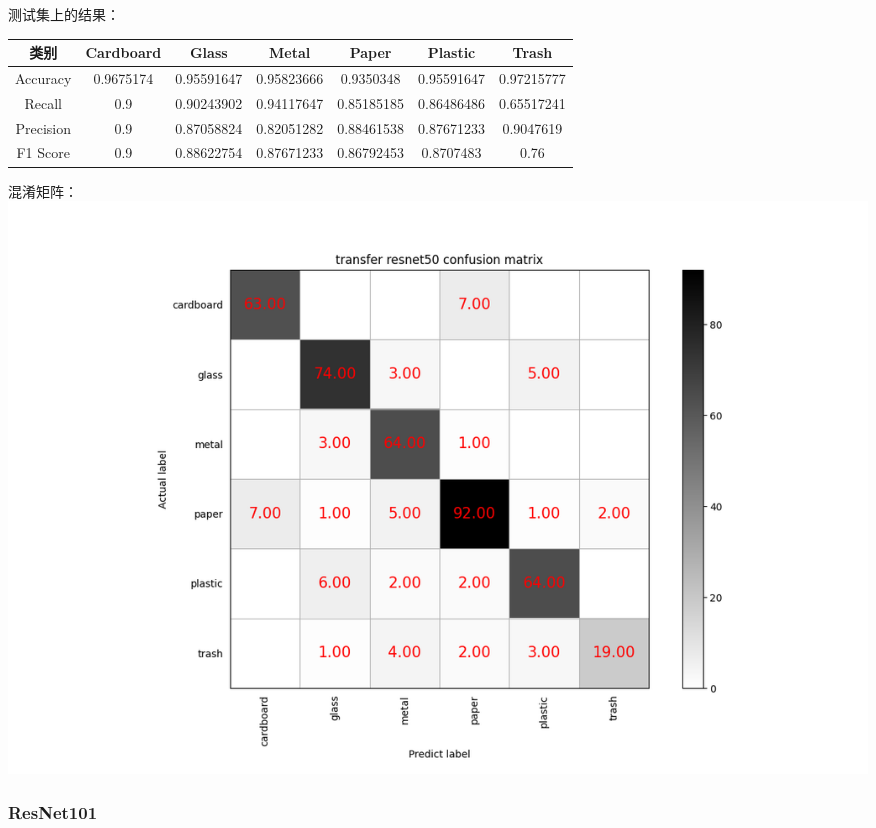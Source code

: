 \documentclass[UTF8]{ctexart}
\begin{document}
测试集上的结果：

\begin{tabular}{|c|c|c|c|c|c|c|}
\hline 
类别 & Cardboard & Glass & Metal & Paper & Plastic & Trash \\ 
\hline 
Accuracy &0.9675174 & 0.95591647& 0.95823666& 0.9350348 & 0.95591647& 0.97215777\\
 \hline 
Recall &0.9       & 0.90243902& 0.94117647& 0.85185185& 0.86486486& 0.65517241\\ 
\hline 
Precision &0.9       & 0.87058824& 0.82051282& 0.88461538& 0.87671233& 0.9047619\\ 
\hline 
F1 Score &0.9       & 0.88622754& 0.87671233& 0.86792453& 0.8707483 & 0.76 \\ 
\hline 
\end{tabular}

混淆矩阵：
\includegraphics[scale=0.5]{cm/res50.png} 

\subsubsection{ResNet101}
 
\end{document}
